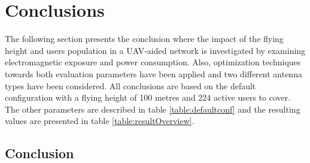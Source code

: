 \chapter{Conclusions}
\label{chap:conclusions}

The following section presents the conclusion where the impact of the flying height and users population in a \gls{UAV}-aided network
is investigated by examining electromagnetic exposure and power consumption. Also, optimization techniques towards both evaluation 
parameters have been applied and two different antenna types have been considered.
All conclusions are based on the default configuration with a flying height of 100 metres and 224 active users to cover.
The other parameters are described in table \ref{table:defaultconf} and the resulting values are presented in table \ref{table:resultOverview}.

\section{Conclusion}

